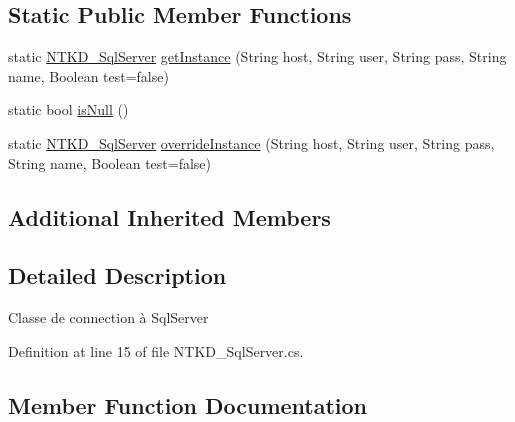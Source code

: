 \subsection*{Static Public Member Functions}
\begin{DoxyCompactItemize}
\item 
static \mbox{\hyperlink{class_n_t_k_1_1_database_1_1_n_t_k_d___sql_server}{N\+T\+K\+D\+\_\+\+Sql\+Server}} \mbox{\hyperlink{class_n_t_k_1_1_database_1_1_n_t_k_d___sql_server_ac1e15ce667398cb1232fa8099a43322c}{get\+Instance}} (String host, String user, String pass, String name, Boolean test=false)
\item 
static bool \mbox{\hyperlink{class_n_t_k_1_1_database_1_1_n_t_k_d___sql_server_a82b9f6ef8eaeefdb2551f36fb7d256fa}{is\+Null}} ()
\item 
static \mbox{\hyperlink{class_n_t_k_1_1_database_1_1_n_t_k_d___sql_server}{N\+T\+K\+D\+\_\+\+Sql\+Server}} \mbox{\hyperlink{class_n_t_k_1_1_database_1_1_n_t_k_d___sql_server_a3ea3acd36aa429e78880129d5334850a}{override\+Instance}} (String host, String user, String pass, String name, Boolean test=false)
\end{DoxyCompactItemize}
\subsection*{Additional Inherited Members}


\subsection{Detailed Description}
Classe de connection à Sql\+Server 



Definition at line 15 of file N\+T\+K\+D\+\_\+\+Sql\+Server.\+cs.



\subsection{Member Function Documentation}
\mbox{\label{class_n_t_k_1_1_database_1_1_n_t_k_d___sql_server_a33a2db6bcd7c390fedc28472a672f8b4}} 
